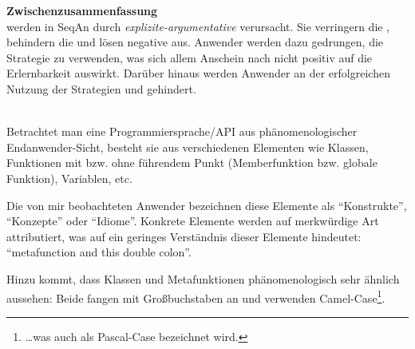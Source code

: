 \begin{itemize}
\begin{description}
\begin{description}
    \end{description}
    
    \textbf{Zwischenzusammenfassung}\\
     werden in SeqAn durch \textit{explizite-argumentative}  verursacht. Sie verringern die , behindern die  und lösen negative  aus. Anwender werden dazu gedrungen, die Strategie  zu verwenden, was sich allem Anschein nach nicht positiv auf die Erlernbarkeit auswirkt. Darüber hinaus werden Anwender an der erfolgreichen Nutzung der Strategien  und  gehindert.


    
    
    \item[\codebullet{apiua://code/-9223372036854775413}] \textbf{}\label{sec:gt-let} \\
    Betrachtet man eine Programmiersprache/API aus phänomenologischer Endanwender-Sicht, besteht sie aus verschiedenen Elementen wie Klassen, Funktionen mit bzw. ohne führendem Punkt (Memberfunktion bzw. globale Funktion), Variablen, etc.
    
    Die von mir beobachteten Anwender bezeichnen diese Elemente als ``Konstrukte'', ``Konzepte'' oder ``Idiome''. Konkrete Elemente werden auf merkwürdige Art attributiert, was auf ein geringes Verständnis dieser Elemente hindeutet: ``metafunction and this double colon''.
    
    Hinzu kommt, dass Klassen und Metafunktionen phänomenologisch sehr ähnlich aussehen: Beide fangen mit Großbuchstaben an und verwenden Camel-Case\footnote{\ldots was auch als Pascal-Case bezeichnet wird.}.
    

\end{description}
\end{itemize}
